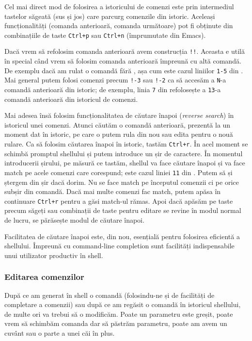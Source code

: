 Cel mai direct mod de folosirea a istoricului de comenzi este prin intermediul
tastelor săgeată (sus și jos) care parcurg comenzile din istoric. Aceleași funcționalități (comanda anterioară, comanda următoare) pot fi obținute din combinațiile de taste \texttt{Ctrl+p} sau \texttt{Ctrl+n} (împrumutate din Emacs).

Dacă vrem să refolosim comanda anterioară avem construcția \texttt{!!}. Aceasta e utilă
în special când vrem să folosim comanda anterioară împreună cu altă comandă. De
exemplu dacă am rulat o comandă fără , așa cum este cazul liniilor \texttt{1-5} din . Mai general putem folosi comenzi precum \texttt{!-3} sau \texttt{!-2} ca să accesăm a \texttt{N}-a comandă anterioară din istoric; de exemplu, linia \texttt{7} din  refolosește a \texttt{13}-a comandă anterioară din istoricul de comenzi.

Mai adesea însă folosim funcționalitatea de căutare înapoi (\textit{reverse search}) în
istoricul unei comenzi. Atunci căutăm o comandă anterioară, prezentă la un
moment dat în istoric, pe care o putem rula din nou sau edita pentru o nouă
rulare. Ca să folosim căutarea înapoi în istoric, tastăm \texttt{Ctrl+r}. În acel moment se
schimbă promptul shellului și putem introduce un șir de caractere. În momentul introducerii șirului, pe măsură ce tastăm, shellul va face căutare
înapoi și va face match pe acele comenzi care corespund; este cazul liniei \texttt{11} din . Putem să și ștergem din
șir dacă dorim. Nu se face match pe începutul comenzii ci pe orice subșir din
comandă. Dacă mai multe comenzi fac match, putem apăsa în continuare \texttt{Ctrl+r}
pentru a găsi match-ul rămas. Apoi dacă apăsăm pe taste precum săgeți sau combinații de taste pentru editare
se revine în modul normal de lucru, se părăsește modul de căutare înapoi.

Facilitatea de căutare înapoi este, din nou, esențială pentru folosirea
eficientă a shellului. Împreună cu command-line completion sunt facilități
indispensabile unui utilizator productiv în shell.

\subsubsection{Editarea comenzilor}
\label{sec:cli:shell:features:editing}

După ce am generat în shell o comandă (folosindu-ne și de facilități de
completare a comenzii) sau după ce am regăsit o comandă în istoricul
shellului, de multe ori va trebui să o modificăm. Poate un parametru este
greșit, poate vrem să schimbăm comanda dar să păstrăm parametru, poate am avem
un cuvânt sau o parte a unei căi în plus.

